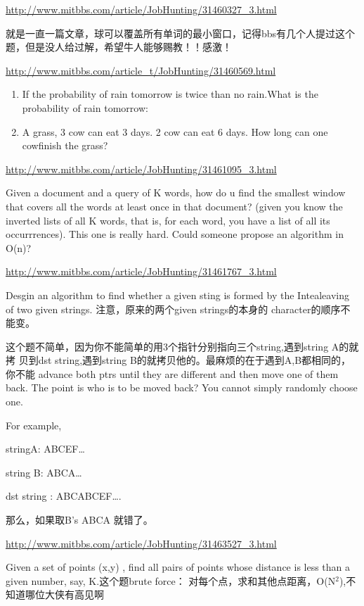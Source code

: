 \documentclass[12pt]{book}
\begin{document}
\url{http://www.mitbbs.com/article/JobHunting/31460327_3.html}

就是一直一篇文章，球可以覆盖所有单词的最小窗口，记得bbs有几个人提过这个题，但是没人给过解，希望牛人能够赐教！！感激！

\url{http://www.mitbbs.com/article_t/JobHunting/31460569.html}

\begin{enumerate}
\item If the probability of rain tomorrow is twice than no rain.What is the probability of rain tomorrow:

\item A grass, 3 cow can eat 3 days. 2 cow can eat 6 days. How long can one cowfinish the grass?
\end{enumerate}

\url{http://www.mitbbs.com/article/JobHunting/31461095_3.html}

Given a document and a query of K words, how do u find the smallest window 
that covers all the words at least once in that document? (given you know 
the inverted lists of all K words, that is, for each word, you have a list 
of all its occurrrences). This one is really hard. Could someone propose an 
algorithm in O(n)?

\url{http://www.mitbbs.com/article/JobHunting/31461767_3.html}

Desgin an algorithm to find whether a given sting is formed by the 
Intealeaving of two given strings. 注意，原来的两个given strings的本身的
character的顺序不能变。

这个题不简单，因为你不能简单的用3个指针分别指向三个string,遇到string A的就拷
贝到dst string,遇到string B的就拷贝他的。最麻烦的在于遇到A,B都相同的，你不能
advance both ptrs until they are different and then move one of them back. 
The point is who is to be moved back? You cannot simply randomly choose one.

For example, 

stringA: ABCEF\ldots{}

string B: ABCA\ldots{}

dst string : ABCABCEF\ldots{}.

那么，如果取B's ABCA 就错了。

\url{http://www.mitbbs.com/article/JobHunting/31463527_3.html}

Given a set of points (x,y) , find all pairs of points whose distance is less than a given number, say, K.这个题brute force： 对每个点，求和其他点距离，O(N$^{\text{2}}$),不知道哪位大侠有高见啊
\end{document}
